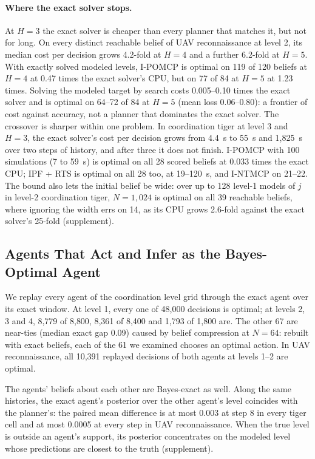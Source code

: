 \documentclass{article}
\begin{document}
\paragraph{Where the exact solver stops.} At $H = 3$ the exact solver is cheaper than every planner that matches it, but not for long. On every distinct reachable belief of UAV reconnaissance at level 2, its median cost per decision grows 4.2-fold at $H = 4$ and a further 6.2-fold at $H = 5$. With exactly solved modeled levels, I-POMCP is optimal on 119 of 120 beliefs at $H = 4$ at 0.47 times the exact solver's CPU, but on 77 of 84 at $H = 5$ at 1.23 times. Solving the modeled target by search costs 0.005--0.10 times the exact solver and is optimal on 64--72 of 84 at $H = 5$ (mean loss 0.06--0.80): a frontier of cost against accuracy, not a planner that dominates the exact solver.
The crossover is sharper within one problem. In coordination tiger at level 3 and $H = 3$, the exact solver's cost per decision grows from 4.4~s to 55~s and 1{,}825~s over two steps of history, and after three it does not finish. I-POMCP with 100 simulations (7 to 59~s) is optimal on all 28 scored beliefs at 0.033 times the exact CPU; IPF + RTS is optimal on all 28 too, at 19--120~s, and I-NTMCP on 21--22.
The bound also lets the initial belief be wide: over up to 128 level-1 models of $j$ in level-2 coordination tiger, $N = 1{,}024$ is optimal on all 39 reachable beliefs, where ignoring the width errs on 14, as its CPU grows 2.6-fold against the exact solver's 25-fold (supplement).

\subsection{Agents That Act and Infer as the Bayes-Optimal Agent}
\label{sec:episodes}

We replay every agent of the coordination level grid through the exact agent over its exact window. At level 1, every one of 48{,}000 decisions is optimal; at levels 2, 3 and 4, 8{,}779 of 8{,}800, 8{,}361 of 8{,}400 and 1{,}793 of 1{,}800 are. The other 67 are near-ties (median exact gap 0.09) caused by belief compression at $N = 64$: rebuilt with exact beliefs, each of the 61 we examined chooses an optimal action. In UAV reconnaissance, all 10{,}391 replayed decisions of both agents at levels 1--2 are optimal.

The agents' beliefs about each other are Bayes-exact as well. Along the same histories, the exact agent's posterior over the other agent's level coincides with the planner's: the paired mean difference is at most 0.003 at step 8 in every tiger cell and at most 0.0005 at every step in UAV reconnaissance. When the true level is outside an agent's support, its posterior concentrates on the modeled level whose predictions are closest to the truth \cite{berk1966limiting} (supplement).
\end{document}
